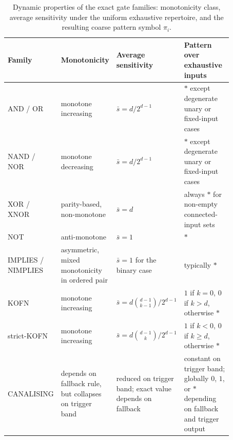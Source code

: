 \documentclass[11pt]{article}
\theoremstyle{definition}
\begin{document}
\begin{table}[t]
\centering
\small
\begin{tabular}{p{0.17\linewidth}p{0.18\linewidth}p{0.24\linewidth}p{0.28\linewidth}}
\toprule
\textbf{Family} & \textbf{Monotonicity} & \textbf{Average sensitivity} & \textbf{Pattern over exhaustive inputs} \\
\midrule
AND / OR & monotone increasing & \(\bar{s}=d/2^{d-1}\) & \(*\) except degenerate unary or fixed-input cases \\
NAND / NOR & monotone decreasing & \(\bar{s}=d/2^{d-1}\) & \(*\) except degenerate unary or fixed-input cases \\
XOR / XNOR & parity-based, non-monotone & \(\bar{s}=d\) & always \(*\) for non-empty connected-input sets \\
NOT & anti-monotone & \(\bar{s}=1\) & \(*\) \\
IMPLIES / NIMPLIES & asymmetric, mixed monotonicity in ordered pair & \(\bar{s}=1\) for the binary case & typically \(*\) \\
KOFN & monotone increasing & \(\bar{s}=d\binom{d-1}{k-1}/2^{d-1}\) & \(1\) if \(k=0\), \(0\) if \(k>d\), otherwise \(*\) \\
strict-KOFN & monotone increasing & \(\bar{s}=d\binom{d-1}{k}/2^{d-1}\) & \(1\) if \(k<0\), \(0\) if \(k\ge d\), otherwise \(*\) \\
CANALISING & depends on fallback rule, but collapses on trigger band & reduced on trigger band; exact value depends on fallback & constant on trigger band; globally \(0\), \(1\), or \(*\) depending on fallback and trigger output \\
\bottomrule
\end{tabular}
\caption{Dynamic properties of the exact gate families: monotonicity class, average sensitivity under the uniform exhaustive repertoire, and the resulting coarse pattern symbol \(\pi_i\).}
\label{tab:dynamic-pattern-summary}
\end{table}
\end{document}
